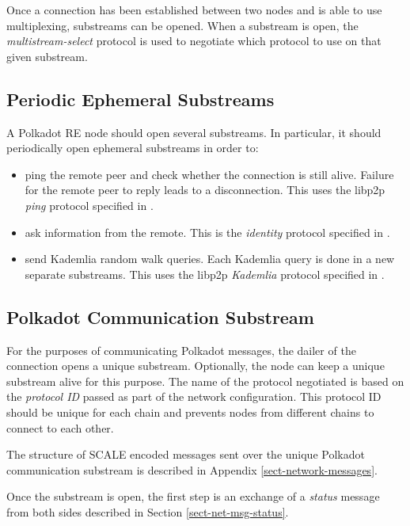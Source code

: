 \documentclass{book}
\newcommand{\tmem}[1]{{\em #1\/}}
\newcommand{\tmtextit}[1]{{\itshape{#1}}}
\providecommand{\tmem}[1]{\tmtextit{#1}}
\providecommand{\tmtextit}[1]{\tmtextit{#1}}
\begin{document}
Once a connection has been established between two nodes and is able to use
multiplexing, substreams can be opened. When a substream is open, the
{\tmem{multistream-select}} protocol is used to negotiate which protocol to
use on that given substream.

\subsection{Periodic Ephemeral Substreams}

A Polkadot RE node should open several substreams. In particular, it should
periodically open ephemeral substreams in order to:
\begin{itemize}
  \item ping the remote peer and check whether the connection is still alive.
  Failure for the remote peer to reply leads to a disconnection. This uses the
  libp2p {\tmem{ping}} protocol specified in
  {\cite{protocol_labs_libp2p_2019}}.
  
  \item ask information from the remote. This is the {\tmem{identity}}
  protocol specified in {\cite{protocol_labs_libp2p_2019}}.
  
  \item send Kademlia random walk queries. Each Kademlia query is done in a
  new separate substreams. This uses the libp2p {\tmem{Kademlia}} protocol
  specified in {\cite{protocol_labs_libp2p_2019}}.
\end{itemize}

\subsection{Polkadot Communication Substream}

For the purposes of communicating Polkadot messages, the dailer of the
connection opens a unique substream. Optionally, the node can keep a unique
substream alive for this purpose. The name of the protocol negotiated is based
on the {\tmem{protocol ID}} passed as part of the network configuration. This
protocol ID should be unique for each chain and prevents nodes from different
chains to connect to each other.

The structure of SCALE encoded messages sent over the unique Polkadot
communication substream is described in Appendix \ref{sect-network-messages}.

Once the substream is open, the first step is an exchange of a {\tmem{status}}
message from both sides described in Section \ref{sect-net-msg-status}.
\end{document}
